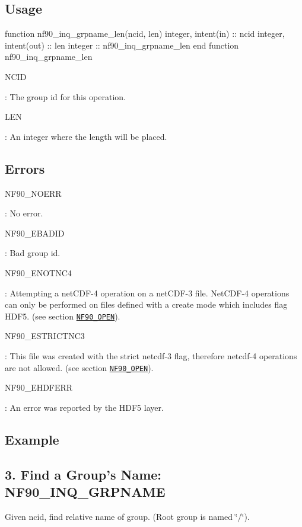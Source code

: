 \subsection*{Usage}


\begin{DoxyCode}
\textcolor{keyword}{function }nf90\_inq\_grpname\_len(ncid, len)
  \textcolor{keywordtype}{integer}, \textcolor{keywordtype}{intent(in)} :: ncid
  \textcolor{keywordtype}{integer}, \textcolor{keywordtype}{intent(out)} :: len
  \textcolor{keywordtype}{integer} :: nf90\_inq\_grpname\_len
\textcolor{keyword}{end function }nf90\_inq\_grpname\_len
\end{DoxyCode}


{\ttfamily N\+C\+ID}

\+: The group id for this operation.

{\ttfamily L\+EN}

\+: An integer where the length will be placed.

\subsection*{Errors}

{\ttfamily N\+F90\+\_\+\+N\+O\+E\+RR}

\+: No error.

{\ttfamily N\+F90\+\_\+\+E\+B\+A\+D\+ID}

\+: Bad group id.

{\ttfamily N\+F90\+\_\+\+E\+N\+O\+T\+N\+C4}

\+: Attempting a net\+C\+D\+F-\/4 operation on a net\+C\+D\+F-\/3 file. Net\+C\+D\+F-\/4 operations can only be performed on files defined with a create mode which includes flag H\+D\+F5. (see section \href{#NF90_005fOPEN}{\tt N\+F90\+\_\+\+O\+P\+EN}).

{\ttfamily N\+F90\+\_\+\+E\+S\+T\+R\+I\+C\+T\+N\+C3}

\+: This file was created with the strict netcdf-\/3 flag, therefore netcdf-\/4 operations are not allowed. (see section \href{#NF90_005fOPEN}{\tt N\+F90\+\_\+\+O\+P\+EN}).

{\ttfamily N\+F90\+\_\+\+E\+H\+D\+F\+E\+RR}

\+: An error was reported by the H\+D\+F5 layer.

\subsection*{Example}\hypertarget{f90_groups_f90-find-a-groups-name-nf90_inq_grpname}{}\subsection{3. Find a Group’s Name\+: N\+F90\+\_\+\+I\+N\+Q\+\_\+\+G\+R\+P\+N\+A\+M\+E }\label{f90_groups_f90-find-a-groups-name-nf90_inq_grpname}
Given ncid, find relative name of group. (Root group is named \char`\"{}/\char`\"{}).

